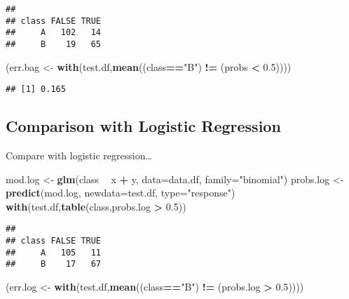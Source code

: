 \documentclass[]{article}
\newenvironment{Shaded}{\begin{snugshade}}{\end{snugshade}}
\newcommand{\DataTypeTok}[1]{\textcolor[rgb]{0.13,0.29,0.53}{#1}}
\newcommand{\FloatTok}[1]{\textcolor[rgb]{0.00,0.00,0.81}{#1}}
\newcommand{\KeywordTok}[1]{\textcolor[rgb]{0.13,0.29,0.53}{\textbf{#1}}}
\newcommand{\NormalTok}[1]{#1}
\newcommand{\OperatorTok}[1]{\textcolor[rgb]{0.81,0.36,0.00}{\textbf{#1}}}
\newcommand{\StringTok}[1]{\textcolor[rgb]{0.31,0.60,0.02}{#1}}
\begin{document}
\begin{verbatim}
##      
## class FALSE TRUE
##     A   102   14
##     B    19   65
\end{verbatim}

\begin{Shaded}
\begin{Highlighting}[]
\NormalTok{(err.bag <-}\StringTok{ }\KeywordTok{with}\NormalTok{(test.df,}\KeywordTok{mean}\NormalTok{((class}\OperatorTok{==}\StringTok{"B"}\NormalTok{) }\OperatorTok{!=}\StringTok{ }\NormalTok{(probs }\OperatorTok{<}\StringTok{ }\FloatTok{0.5}\NormalTok{))))}
\end{Highlighting}
\end{Shaded}

\begin{verbatim}
## [1] 0.165
\end{verbatim}

\hypertarget{comparison-with-logistic-regression}{%
\subsection{Comparison with Logistic
Regression}\label{comparison-with-logistic-regression}}

Compare with logistic regression\ldots{}

\begin{Shaded}
\begin{Highlighting}[]
\NormalTok{mod.log <-}\StringTok{ }\KeywordTok{glm}\NormalTok{(class }\OperatorTok{~}\StringTok{ }\NormalTok{x }\OperatorTok{+}\StringTok{ }\NormalTok{y,}
               \DataTypeTok{data=}\NormalTok{data.df,}
               \DataTypeTok{family=}\StringTok{"binomial"}\NormalTok{)}
\NormalTok{probs.log <-}\StringTok{ }\KeywordTok{predict}\NormalTok{(mod.log,}
                     \DataTypeTok{newdata=}\NormalTok{test.df,}
                     \DataTypeTok{type=}\StringTok{"response"}\NormalTok{)}
\KeywordTok{with}\NormalTok{(test.df,}\KeywordTok{table}\NormalTok{(class,probs.log }\OperatorTok{>}\StringTok{ }\FloatTok{0.5}\NormalTok{))}
\end{Highlighting}
\end{Shaded}

\begin{verbatim}
##      
## class FALSE TRUE
##     A   105   11
##     B    17   67
\end{verbatim}

\begin{Shaded}
\begin{Highlighting}[]
\NormalTok{(err.log <-}\StringTok{ }\KeywordTok{with}\NormalTok{(test.df,}\KeywordTok{mean}\NormalTok{((class}\OperatorTok{==}\StringTok{"B"}\NormalTok{) }\OperatorTok{!=}\StringTok{ }\NormalTok{(probs.log }\OperatorTok{>}\StringTok{ }\FloatTok{0.5}\NormalTok{))))}
\end{Highlighting}
\end{Shaded}
\end{document}
